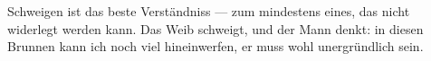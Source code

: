 Schweigen ist das beste Verständniss — zum mindestens eines, das nicht widerlegt werden kann. Das Weib schweigt, und der Mann denkt: in diesen Brunnen kann ich noch viel hineinwerfen, er muss wohl unergründlich sein.
\par

